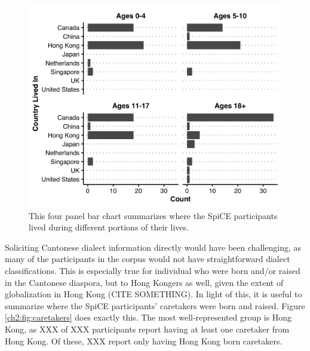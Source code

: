 \begin{figure}[!htbp]
  \begin{center}
  \includegraphics[width=4.9in]{figures/ch2_placeslived_5in.png} 
  \caption{This four panel bar chart summarizes where the SpiCE participants lived during different portions of their lives. }
  \label{ch2:fig:placeslived}
  \end{center}
\end{figure}

Soliciting Cantonese dialect information directly would have been challenging, as many of the participants in the corpus would not have straightforward dialect classifications. This is especially true for individual who were born and/or raised in the Cantonese diaspora, but to Hong Kongers as well, given the extent of globalization in Hong Kong (CITE SOMETHING). In light of this, it is useful to summarize where the SpiCE participants' caretakers were born and raised. Figure \ref{ch2:fig:caretakers} does exactly this. The most well-represented group is Hong Kong, as XXX of XXX participants report having at least one caretaker from Hong Kong. Of these, XXX report only having Hong Kong born caretakers.

